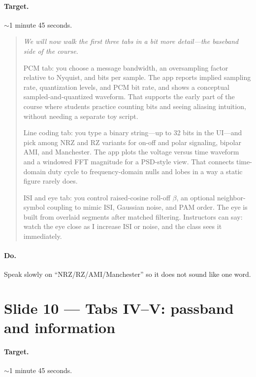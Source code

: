 \documentclass[11pt,a4paper]{article}
\newcommand{\speak}[1]{%
  \begin{quote}\itshape #1\end{quote}%
}
\newcommand{\doitem}[1]{\paragraph{Do.} #1\par\vspace{0.6em}}
\begin{document}
\paragraph{Target.} $\sim$1 minute 45 seconds.

\speak{%
We will now walk the first three tabs in a bit more detail---the baseband side of the course.

PCM tab: you choose a message bandwidth, an oversampling factor relative to Nyquist, and bits per sample. The app reports implied sampling rate, quantization levels, and PCM bit rate, and shows a conceptual sampled-and-quantized waveform. That supports the early part of the course where students practice counting bits and seeing aliasing intuition, without needing a separate toy script.

Line coding tab: you type a binary string---up to 32 bits in the UI---and pick among NRZ and RZ variants for on-off and polar signaling, bipolar AMI, and Manchester. The app plots the voltage versus time waveform and a windowed FFT magnitude for a PSD-style view. That connects time-domain duty cycle to frequency-domain nulls and lobes in a way a static figure rarely does.

ISI and eye tab: you control raised-cosine roll-off $\beta$, an optional neighbor-symbol coupling to mimic ISI, Gaussian noise, and PAM order. The eye is built from overlaid segments after matched filtering. Instructors can say: watch the eye close as I increase ISI or noise, and the class sees it immediately.%
}

\doitem{Speak slowly on ``NRZ/RZ/AMI/Manchester'' so it does not sound like one word.}

\section{Slide 10 --- Tabs IV--V: passband and information}

\paragraph{Target.} $\sim$1 minute 45 seconds.
\end{document}
